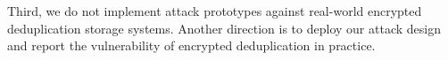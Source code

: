  


Third, we do not implement  attack prototypes against real-world encrypted deduplication storage systems. Another direction is to deploy our attack design and 
report the vulnerability of encrypted deduplication in practice.









